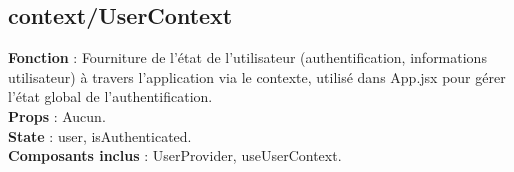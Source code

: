 \documentclass{article}
\begin{document}
\subsection*{context/UserContext}
\textbf{Fonction} : Fourniture de l'état de l'utilisateur (authentification, informations utilisateur) à travers l'application via le contexte, utilisé dans App.jsx pour gérer l’état global de l’authentification.\\
\textbf{Props} : Aucun.\\
\textbf{State} : user, isAuthenticated.\\
\textbf{Composants inclus} : UserProvider, useUserContext.
\end{document}
